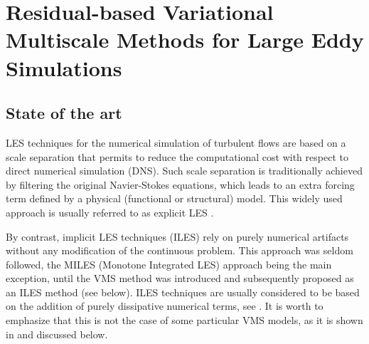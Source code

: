 \chapter{Residual-based Variational Multiscale Methods for Large Eddy Simulations}
\label{chap-Rb_VMS}
\section{State of the art}

LES techniques for the numerical simulation of turbulent flows \cite{Sagaut2006} are based on a scale separation that permits to reduce the computational cost with respect to direct numerical simulation (DNS). Such scale separation is traditionally achieved by filtering the original Navier-Stokes equations, which leads to an extra forcing term defined by a physical (functional or structural) model. This widely used approach is usually referred to as explicit LES \cite{Sagaut2006}.

By contrast, implicit LES techniques (ILES) rely on purely numerical artifacts without any modification of the continuous problem. This approach was seldom followed, the MILES (Monotone Integrated LES) approach \cite{Boris1992,Fureby2002,Grinstein2007} being the main exception, until the VMS method was introduced \cite{hughes_multiscale_1995,hughes_variational_1998} and subsequently proposed as an ILES method (see below). ILES techniques are usually considered to be based on the addition of purely dissipative numerical terms, see  \cite[Section 5.3.4]{Sagaut2006}. It is worth to emphasize that this is not the case of some particular VMS models, as it is shown in \cite{Principe2009} and discussed below.

